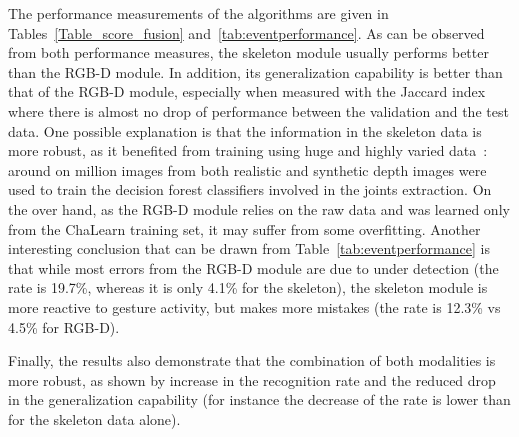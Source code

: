 %
The performance measurements  of the algorithms are given in Tables~\ref{Table_score_fusion} and~\ref{tab:eventperformance}.
%
As can be observed from both performance measures, the skeleton module usually  performs better than the RGB-D module.
In addition, its generalization capability  is better than that of the RGB-D module,
especially when measured with the Jaccard index where there is almost no drop of performance between the validation and the test data.
%
One possible explanation is that the information in the skeleton data is more robust, as it benefited from training using huge and highly
varied data~\cite{shotton2011real}: around on million images from both realistic and synthetic depth images were used to train
the decision forest classifiers involved in the joints extraction.
%
On the over hand, as the  RGB-D module relies on  the raw data and was learned only from the ChaLearn training set, it may
suffer from some overfitting.
%
Another interesting conclusion that can be drawn from Table~\ref{tab:eventperformance} is that while most errors from the RGB-D module are due to under detection
(the \eventmissed rate is 19.7\%, whereas it is only 4.1\% for the skeleton), the skeleton module is more reactive to gesture activity, but makes more mistakes
(the \eventconfused rate is 12.3\% vs 4.5\% for RGB-D).


Finally, the results also demonstrate  that the combination of both modalities is more robust,
as shown by increase in the recognition rate and the reduced drop in the generalization capability
(for instance the decrease of the \eventaccuracy rate is lower than for the skeleton data alone).

